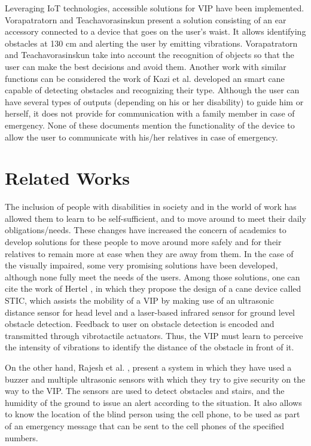 \documentclass{svproc}
\begin{document}
Leveraging IoT technologies, accessible solutions for VIP have been implemented.
Vorapatratorn and Teachavorasinskun \cite{Vorapatratorn2017} present a solution consisting
of an ear accessory connected to a device that goes on the user’s waist. It allows
identifying obstacles at 130 cm and alerting the user by emitting vibrations.
Vorapatratorn and Teachavorasinskun \cite{Vorapatratorn2017} take into account the recognition of
objects so that the user can make the best decisions and avoid them. Another
work with similar functions can be considered the work of Kazi et al. \cite{Kasi2023} developed
an smart cane capable of detecting obstacles and recognizing their type.
Although the user can have several types of outputs (depending on his or her
disability) to guide him or herself, it does not provide for communication with a
family member in case of emergency. None of these documents mention the functionality
of the device to allow the user to communicate with his/her relatives
in case of emergency.

\section{Related Works}

The inclusion of people with disabilities in society and in the world of work has
allowed them to learn to be self-sufficient, and to move around to meet their
daily obligations/needs. These changes have increased the concern of academics
to develop solutions for these people to move around more safely and for their
relatives to remain more at ease when they are away from them. In the case
of the visually impaired, some very promising solutions have been developed,
although none fully meet the needs of the users. Among those solutions, one
can cite the work of Hertel \cite{Hertel2019}, in which they propose the design of a cane
device called STIC, which assists the mobility of a VIP by making use of an
ultrasonic distance sensor for head level and a laser-based infrared sensor for
ground level obstacle detection. Feedback to user on obstacle detection is encoded
and transmitted through vibrotactile actuators. Thus, the VIP must learn to
perceive the intensity of vibrations to identify the distance of the obstacle in
front of it.

On the other hand, Rajesh et al. \cite{Rajesh2023}, present a system in which they have
used a buzzer and multiple ultrasonic sensors with which they try to give security
on the way to the VIP. The sensors are used to detect obstacles and stairs, and
the humidity of the ground to issue an alert according to the situation. It also
allows to know the location of the blind person using the cell phone, to be used as
part of an emergency message that can be sent to the cell phones of the specified
numbers.
\end{document}
